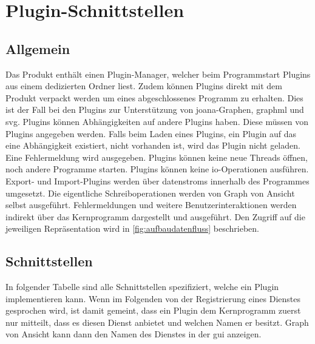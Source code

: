 \chapter{Plugin-Schnittstellen}
\label{ch:plugschnitt}

\setcounter{psnr}{10}
\newcommand{\psno}[1]{\subsubsection{#1}\addtocounter{psnr}{10}}
\renewcommand\thesubsubsection{/S\ifnum\value{psnr}<10 00\else\ifnum\value{psnr}<100 0\fi\fi\arabic{psnr}/}

\section{Allgemein}

Das Produkt enthält einen Plugin-Manager, welcher beim Programmstart Plugins aus einem dedizierten Ordner liest.
Zudem können Plugins direkt mit dem Produkt verpackt werden um eines abgeschlossenes Programm zu erhalten.
Dies ist der Fall bei den Plugins zur Unterstützung von \gls{joana}-Graphen, \gls{graphml} und \gls{svg}.
Plugins können Abhängigkeiten auf andere Plugins haben. Diese müssen von Plugins angegeben werden.
Falls beim Laden eines Plugins, ein Plugin auf das eine Abhängigkeit existiert, nicht vorhanden ist, wird das Plugin
nicht geladen. Eine Fehlermeldung wird ausgegeben.
Plugins können keine neue Threads öffnen, noch andere Programme starten. Plugins können keine \gls{io}-Operationen ausführen.
Export- und Import-Plugins werden über \glspl{datenstrom} innerhalb des Programmes umgesetzt. Die eigentliche Schreiboperationen
werden von Graph von Ansicht selbst ausgeführt. Fehlermeldungen und weitere Benutzerinteraktionen werden indirekt über das Kernprogramm dargestellt und ausgeführt. Den Zugriff auf die jeweiligen Repräsentation wird in \autoref{fig:aufbaudatenfluss} beschrieben.\\

\section{Schnittstellen}
In folgender Tabelle sind alle Schnittstellen spezifiziert, welche ein Plugin implementieren kann.
Wenn im Folgenden von der Registrierung eines Dienstes gesprochen wird, ist damit gemeint, dass ein Plugin dem Kernprogramm zuerst nur mitteilt, dass es diesen Dienst anbietet und welchen Namen er besitzt. Graph von Ansicht kann dann den Namen des Dienstes in der \gls{gui} anzeigen.


